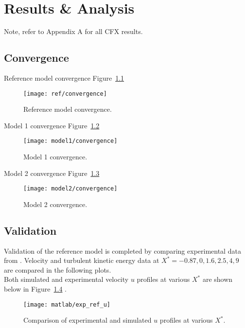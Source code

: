\chapter{Results \& Analysis}
\label{ch:res}

Note, refer to Appendix A for all CFX results.

\section{Convergence}
\label{sec:convg}

Reference model convergence Figure~\ref{fig:ref_convg}
\begin{figure}[H]
	\centering
	\texttt{[image: ref/convergence]}
	\caption{Reference model convergence.}
	\label{fig:ref_convg}
\end{figure}


Model 1 convergence Figure~\ref{fig:mod1_convg}
\begin{figure}[H]
	\centering
	\texttt{[image: model1/convergence]}
	\caption{Model 1 convergence.}
	\label{fig:mod1_convg}
\end{figure}


Model 2 convergence Figure~\ref{fig:mod2_convg}
\begin{figure}[H]
	\centering
	\texttt{[image: model2/convergence]}
	\caption{Model 2 convergence.}
	\label{fig:mod2_convg}
\end{figure}


\section{Validation}
\label{sec:err}
Validation of the reference model is completed by comparing experimental data from \cite{art}. Velocity and turbulent kinetic energy data at $X^*=-0.87, 0, 1.6, 2.5, 4, 9$ are compared in the following plots.\\

Both simulated and experimental velocity $u$ profiles at various $X^*$ are shown below in Figure~\ref{fig:exp_ref_u} \cite{matlab}.
\begin{figure}[H]
	\centering
	\texttt{[image: matlab/exp\_ref\_u]}
	\caption{Comparison of experimental and simulated $u$ profiles at various $X^*$.}
	\label{fig:exp_ref_u}
\end{figure}

